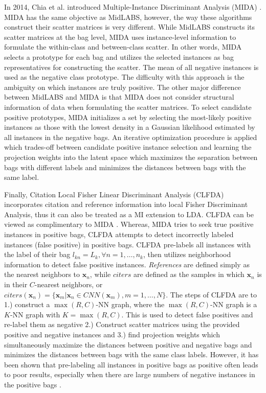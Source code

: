 In 2014, Chia et al. introduced Multiple-Instance Discriminant Analysis (MIDA) \citep{Chai2014MIDA}.  MIDA has the same objective as MidLABS, however, the way these algorithms construct their scatter matrices is very different.  While MidLABS constructs its  scatter matrices at the bag level, MIDA  uses instance-level information to formulate the within-class and between-class scatter.  In other words, MIDA selects a prototype for each bag and utilizes the selected instances as bag representatives for constructing the scatter.  The mean of all negative instances is used as the negative class prototype. The difficulty with this approach is the ambiguity on which instances are truly positive.  The other major difference between MidLABS and MIDA is that MIDA does not consider structural information of data when formulating the scatter matrices. To select candidate positive prototypes, MIDA initializes a set by selecting the most-likely positive instances as those with the lowest density in a Gaussian likelihood estimated by all instances in the negative bags.  An iterative optimization procedure is applied which trades-off between candidate positive instance selection and learning the projection weights into the latent space  which maximizes the separation between bags with different labels and minimizes the distances between bags with the same label.

Finally, Citation Local Fisher Linear Discriminant Analysis (CLFDA) \citep{Kim2010LocalDRMIL} incorporates citation and reference information into local Fisher Discriminant Analysis, thus it can also be treated as a MI extension to LDA.  CLFDA can be viewed as complimentary to MIDA \citep{Chai2014MIDA}.  Whereas, MIDA tries to seek true positive instances in positive bags, CLFDA attempts to detect incorrectly labeled instances (false positive) in positive bags.  CLFDA pre-labels all instances with the label of their bag  $l_{kn} = L_{k}, \forall n = 1,\dots,n_{k}$, then utilizes neighborhood information to detect false positive instances. \textit{References} are defined simply as the nearest neighbors to $\bm{x}_{n}$, while $citers$ are defined as the samples in which $\bm{x}_{n}$ is in their $C$-nearest neighbors, or $citers(\bm{x}_{n}) = \{ \bm{x}_{m}| \bm{x}_{n} \in CNN(\bm{x}_{m}), m=1, \dots, N \}$.   The steps of CLFDA are to 1.) construct a $\max(R,C)$-NN graph, where the $\max(R,C)$-NN graph is a $K$-NN graph with $K=\max(R,C)$.  This is used to detect false positives and re-label them as negative 2.) Construct scatter matrices using the provided positive and negative instances and 3.) find projection weights which simultaneously maximize the distances between positive and negative bags and minimizes the distances between bags with the same class labels.  However, it has been shown that pre-labeling all instances in positive bags as positive often leads to poor results, especially when there are large numbers of negative instances in the positive bags \citep{Chai2014MIDA}.

